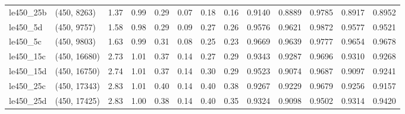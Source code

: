 \begin{tabular}{llrrrrrrrrrrr}
 le450\_25b &  (450, 8263) &  1.37 & 0.99 & 0.29 & 0.07 &  0.18 &   0.16 &   0.9140 &   0.8889 &    0.9785 &     0.8917 &      0.8952 \\
  le450\_5d &  (450, 9757) &  1.58 & 0.98 & 0.29 & 0.09 &  0.27 &   0.26 &   0.9576 &   0.9621 &    0.9872 &     0.9577 &      0.9521 \\
  le450\_5c &  (450, 9803) &  1.63 & 0.99 & 0.31 & 0.08 &  0.25 &   0.23 &   0.9669 &   0.9639 &    0.9777 &     0.9654 &      0.9678 \\
 le450\_15c & (450, 16680) &  2.73 & 1.01 & 0.37 & 0.14 &  0.27 &   0.29 &   0.9343 &   0.9287 &    0.9696 &     0.9310 &      0.9268 \\
 le450\_15d & (450, 16750) &  2.74 & 1.01 & 0.37 & 0.14 &  0.30 &   0.29 &   0.9523 &   0.9074 &    0.9687 &     0.9097 &      0.9241 \\
 le450\_25c & (450, 17343) &  2.83 & 1.01 & 0.40 & 0.14 &  0.40 &   0.38 &   0.9267 &   0.9229 &    0.9679 &     0.9256 &      0.9157 \\
 le450\_25d & (450, 17425) &  2.83 & 1.00 & 0.38 & 0.14 &  0.40 &   0.35 &   0.9324 &   0.9098 &    0.9502 &     0.9314 &      0.9420 \\
\bottomrule
\end{tabular}

